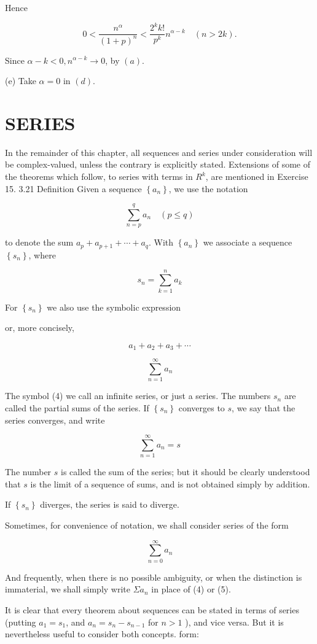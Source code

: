 \documentclass[10pt]{article}
\begin{document}
Hence

$$
0<\frac{n^{\alpha}}{(1+p)^{n}}<\frac{2^{k} k !}{p^{k}} n^{\alpha-k} \quad(n>2 k) .
$$

Since $\alpha-k<0, n^{\alpha-k} \rightarrow 0$, by $(a)$.

(e) Take $\alpha=0$ in $(d)$.

\section{SERIES}
In the remainder of this chapter, all sequences and series under consideration will be complex-valued, unless the contrary is explicitly stated. Extensions of some of the theorems which follow, to series with terms in $R^{k}$, are mentioned in Exercise 15. 3.21 Definition Given a sequence $\left\{a_{n}\right\}$, we use the notation

$$
\sum_{n=p}^{q} a_{n} \quad(p \leq q)
$$

to denote the sum $a_{p}+a_{p+1}+\cdots+a_{q}$. With $\left\{a_{n}\right\}$ we associate a sequence $\left\{s_{n}\right\}$, where

$$
s_{n}=\sum_{k=1}^{n} a_{k}
$$

For $\left\{s_{n}\right\}$ we also use the symbolic expression

or, more concisely,

$$
a_{1}+a_{2}+a_{3}+\cdots
$$

$$
\sum_{n=1}^{\infty} a_{n}
$$

The symbol (4) we call an infinite series, or just a series. The numbers $s_{n}$ are called the partial sums of the series. If $\left\{s_{n}\right\}$ converges to $s$, we say that the series converges, and write

$$
\sum_{n=1}^{\infty} a_{n}=s
$$

The number $s$ is called the sum of the series; but it should be clearly understood that $s$ is the limit of a sequence of sums, and is not obtained simply by addition.

If $\left\{s_{n}\right\}$ diverges, the series is said to diverge.

Sometimes, for convenience of notation, we shall consider series of the form

$$
\sum_{n=0}^{\infty} a_{n}
$$

And frequently, when there is no possible ambiguity, or when the distinction is immaterial, we shall simply write $\Sigma a_{n}$ in place of (4) or (5).

It is clear that every theorem about sequences can be stated in terms of series (putting $a_{1}=s_{1}$, and $a_{n}=s_{n}-s_{n-1}$ for $n>1$ ), and vice versa. But it is nevertheless useful to consider both concepts. form:
\end{document}
